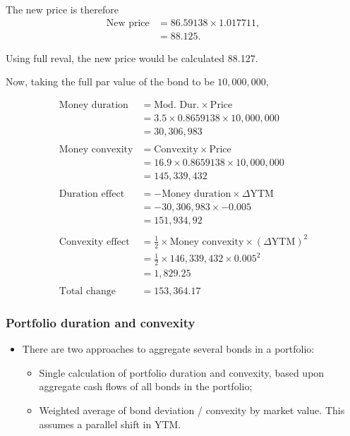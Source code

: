 \documentclass[../notes_compiled.tex]{subfiles}
\begin{document}
\begin{itemize}
{The new price is therefore
\begin{align*}
\text{New price} &= 86.59138 \times 1.017711, \\
&=88.125.
\end{align*}

Using full reval, the new price would be calculated 88.127.
}

{\color{RedViolet}
Now, taking the full par value of the bond to be $10,000,000$,
}

{\color{RoyalBlue}
\begin{align*}
\text{Money duration} &= \text{Mod. Dur.} \times \text{Price} \\
&= 3.5 \times 0.8659138 \times 10,000,000 \\
& = 30,306,983 \\ \\
\text{Money convexity} & = \text{Convexity} \times \text{Price} \\
&=16.9 \times 0.8659138 \times 10,000,000 \\
&=145,339,432 \\ \\
\text{Duration effect} &= -\text{Money duration} \times \Delta\text{YTM} \\
&= -30,306,983 \times -0.005 \\
&= 151,934,92 \\ \\
\text{Convexity effect} &= \frac{1}{2} \times \text{Money convexity} \times (\Delta\text{YTM})^{2} \\
&= \frac{1}{2} \times 146,339,432 \times 0.005^{2} \\
&=1,829.25 \\ \\
\text{Total change} &= 153,364.17
\end{align*}
}
\end{itemize}

\subsubsection{Portfolio duration and convexity}
\begin{itemize}
\item There are two approaches to aggregate several bonds in a portfolio:
\begin{itemize}
\item Single calculation of portfolio duration and convexity, based upon aggregate cash flows of all bonds in the portfolio;
\item Weighted average of bond deviation / convexity by market value. This assumes a parallel shift in YTM.
\end{itemize}
\end{itemize}
\end{document}
